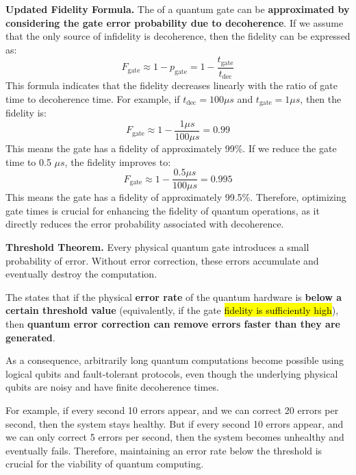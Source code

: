 \highspace
\textcolor{Green3}{ \textbf{Updated Fidelity Formula.}} The  of a quantum gate can be \textbf{approximated by considering the gate error probability due to decoherence}. If we assume that the only source of infidelity is decoherence, then the fidelity can be expressed as:
\begin{equation}\label{eq:fidelity-decoherence}
    F_{\text{gate}} \approx 1 - p_{\text{gate}} = 1 - \frac{t_{\text{gate}}}{t_{\text{dec}}}
\end{equation}
This formula indicates that the fidelity decreases linearly with the ratio of gate time to decoherence time. For example, if $t_{\text{dec}} = 100 \mu s$ and $t_{\text{gate}} = 1 \mu s$, then the fidelity is:
\begin{equation*}
    F_{\text{gate}} \approx 1 - \frac{1 \mu s}{100 \mu s} = 0.99
\end{equation*}
This means the gate has a fidelity of approximately 99\%. If we reduce the gate time to 0.5 $\mu s$, the fidelity improves to:
\begin{equation*}
    F_{\text{gate}} \approx 1 - \frac{0.5 \mu s}{100 \mu s} = 0.995
\end{equation*}
This means the gate has a fidelity of approximately 99.5\%. Therefore, optimizing gate times is crucial for enhancing the fidelity of quantum operations, as it directly reduces the error probability associated with decoherence.\label{def:threshold-theorem}

\highspace
\textcolor{Green3}{ \textbf{Threshold Theorem.}} Every physical quantum gate introduces a small probability of error.
Without error correction, these errors accumulate and eventually destroy the computation.

\highspace
The  states that if the physical \textbf{error rate} of the quantum hardware is \textbf{below a certain threshold value} (equivalently, if the gate \hl{fidelity is sufficiently high}), then \textbf{quantum error correction can remove errors faster than they are generated}.

\highspace
As a consequence, arbitrarily long quantum computations become possible using logical qubits and fault-tolerant protocols, even though the underlying physical qubits are noisy and have finite decoherence times.

\highspace
For example, if every second 10 errors appear, and we can correct 20 errors per second, then the system stays healthy. But if every second 10 errors appear, and we can only correct 5 errors per second, then the system becomes unhealthy and eventually fails. Therefore, maintaining an error rate below the threshold is crucial for the viability of quantum computing.
